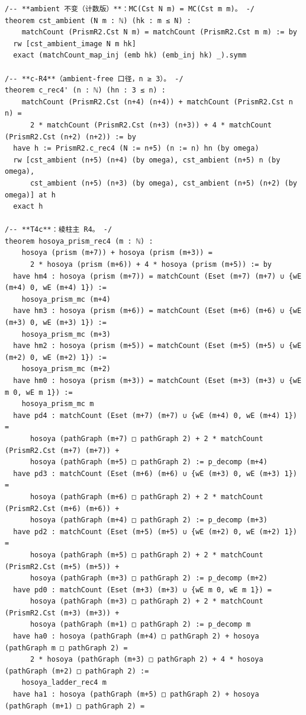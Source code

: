 \documentclass[11pt]{article}
\begin{document}
\begin{lstlisting}
/-- **ambient 不变（计数版）**：MC(Cst N m) = MC(Cst m m)。 -/
theorem cst_ambient (N m : ℕ) (hk : m ≤ N) :
    matchCount (PrismR2.Cst N m) = matchCount (PrismR2.Cst m m) := by
  rw [cst_ambient_image N m hk]
  exact (matchCount_map_inj (emb hk) (emb_inj hk) _).symm

/-- **c-R4**（ambient-free 口径，n ≥ 3）。 -/
theorem c_rec4' (n : ℕ) (hn : 3 ≤ n) :
    matchCount (PrismR2.Cst (n+4) (n+4)) + matchCount (PrismR2.Cst n n) =
      2 * matchCount (PrismR2.Cst (n+3) (n+3)) + 4 * matchCount (PrismR2.Cst (n+2) (n+2)) := by
  have h := PrismR2.c_rec4 (N := n+5) (n := n) hn (by omega)
  rw [cst_ambient (n+5) (n+4) (by omega), cst_ambient (n+5) n (by omega),
      cst_ambient (n+5) (n+3) (by omega), cst_ambient (n+5) (n+2) (by omega)] at h
  exact h

/-- **T4c**：棱柱主 R4。 -/
theorem hosoya_prism_rec4 (m : ℕ) :
    hosoya (prism (m+7)) + hosoya (prism (m+3)) =
      2 * hosoya (prism (m+6)) + 4 * hosoya (prism (m+5)) := by
  have hm4 : hosoya (prism (m+7)) = matchCount (Eset (m+7) (m+7) ∪ {wE (m+4) 0, wE (m+4) 1}) :=
    hosoya_prism_mc (m+4)
  have hm3 : hosoya (prism (m+6)) = matchCount (Eset (m+6) (m+6) ∪ {wE (m+3) 0, wE (m+3) 1}) :=
    hosoya_prism_mc (m+3)
  have hm2 : hosoya (prism (m+5)) = matchCount (Eset (m+5) (m+5) ∪ {wE (m+2) 0, wE (m+2) 1}) :=
    hosoya_prism_mc (m+2)
  have hm0 : hosoya (prism (m+3)) = matchCount (Eset (m+3) (m+3) ∪ {wE m 0, wE m 1}) :=
    hosoya_prism_mc m
  have pd4 : matchCount (Eset (m+7) (m+7) ∪ {wE (m+4) 0, wE (m+4) 1}) =
      hosoya (pathGraph (m+7) □ pathGraph 2) + 2 * matchCount (PrismR2.Cst (m+7) (m+7)) +
      hosoya (pathGraph (m+5) □ pathGraph 2) := p_decomp (m+4)
  have pd3 : matchCount (Eset (m+6) (m+6) ∪ {wE (m+3) 0, wE (m+3) 1}) =
      hosoya (pathGraph (m+6) □ pathGraph 2) + 2 * matchCount (PrismR2.Cst (m+6) (m+6)) +
      hosoya (pathGraph (m+4) □ pathGraph 2) := p_decomp (m+3)
  have pd2 : matchCount (Eset (m+5) (m+5) ∪ {wE (m+2) 0, wE (m+2) 1}) =
      hosoya (pathGraph (m+5) □ pathGraph 2) + 2 * matchCount (PrismR2.Cst (m+5) (m+5)) +
      hosoya (pathGraph (m+3) □ pathGraph 2) := p_decomp (m+2)
  have pd0 : matchCount (Eset (m+3) (m+3) ∪ {wE m 0, wE m 1}) =
      hosoya (pathGraph (m+3) □ pathGraph 2) + 2 * matchCount (PrismR2.Cst (m+3) (m+3)) +
      hosoya (pathGraph (m+1) □ pathGraph 2) := p_decomp m
  have ha0 : hosoya (pathGraph (m+4) □ pathGraph 2) + hosoya (pathGraph m □ pathGraph 2) =
      2 * hosoya (pathGraph (m+3) □ pathGraph 2) + 4 * hosoya (pathGraph (m+2) □ pathGraph 2) :=
    hosoya_ladder_rec4 m
  have ha1 : hosoya (pathGraph (m+5) □ pathGraph 2) + hosoya (pathGraph (m+1) □ pathGraph 2) =

\end{lstlisting}
\end{document}
